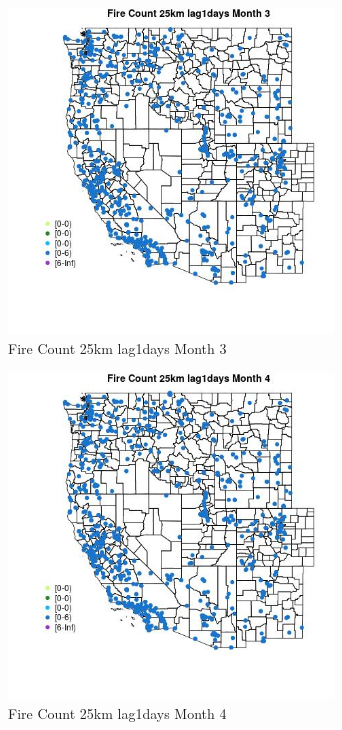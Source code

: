 \begin{figure} 
\centering  
\includegraphics[width=0.77\textwidth]{Code_Outputs/Report_ML_input_PM25_Step4_part_e_de_duplicated_aves_compiled_2019-05-21wNAs_MapObsMo3Fire_Count_25km_lag1days.jpg} 
\caption{\label{fig:Report_ML_input_PM25_Step4_part_e_de_duplicated_aves_compiled_2019-05-21wNAsMapObsMo3Fire_Count_25km_lag1days}Fire Count 25km lag1days Month 3} 
\end{figure} 
 

\begin{figure} 
\centering  
\includegraphics[width=0.77\textwidth]{Code_Outputs/Report_ML_input_PM25_Step4_part_e_de_duplicated_aves_compiled_2019-05-21wNAs_MapObsMo4Fire_Count_25km_lag1days.jpg} 
\caption{\label{fig:Report_ML_input_PM25_Step4_part_e_de_duplicated_aves_compiled_2019-05-21wNAsMapObsMo4Fire_Count_25km_lag1days}Fire Count 25km lag1days Month 4} 
\end{figure} 
 

